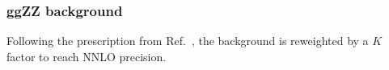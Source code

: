 \subsubsection{ggZZ background}
Following the prescription from Ref.~\cite{HIG_19_001}, the \ggzzfourl background is reweighted by a $K$ factor to reach NNLO precision.

